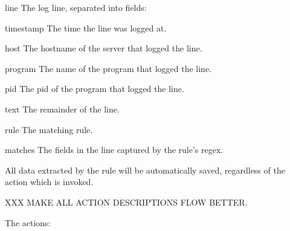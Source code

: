 \begin{eqlist}

    \item [line] The log line, separated into fields:

        \begin{eqlist}

            \item [timestamp] The time the line was logged at.

            \item [host] The hostname of the server that logged the line.

            \item [program] The name of the program that logged the line.

            \item [pid] The \gls{pid} of the program that logged the line.

            \item [text] The remainder of the line.

        \end{eqlist}

    \item [rule] The matching rule.

    \item [matches] The fields in the line captured by the rule's regex.

\end{eqlist}

All data extracted by the rule will be automatically saved, regardless of
the action which is invoked.

XXX MAKE ALL ACTION DESCRIPTIONS FLOW BETTER\@.  

The actions:


